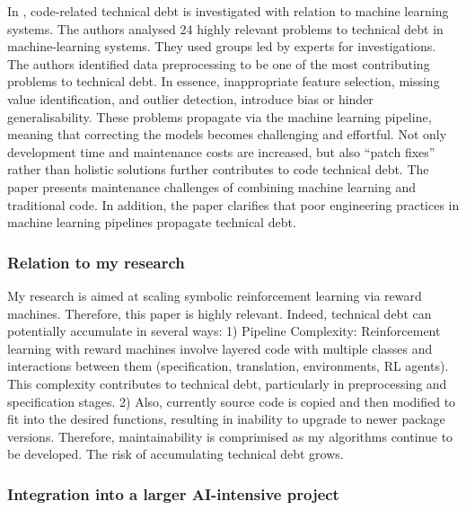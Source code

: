 \documentclass[a4paper,10pt]{article} %
\begin{document}
In \cite{ximenes2025investigating}, code-related technical debt is investigated with relation to machine learning systems.
The authors analysed 24 highly relevant problems to technical debt in machine-learning systems.
They used groups led by experts for investigations.
The authors identified data preprocessing to be one of the most contributing problems to technical debt.
In essence, inappropriate feature selection, missing value identification, and outlier detection,
introduce bias or hinder generalisability.
These problems propagate via the machine learning pipeline, meaning that correcting the models becomes challenging and effortful.
Not only development time and maintenance costs are increased, but also ``patch fixes'' rather than holistic solutions further contributes to code technical debt.
The paper presents maintenance challenges of combining machine learning and traditional code.
In addition, the paper clarifies that poor engineering practices in machine learning pipelines propagate technical debt.

\subsubsection{Relation to my research}

My research is aimed at scaling symbolic reinforcement learning via reward machines.
Therefore, this paper is highly relevant.
Indeed, technical debt can potentially accumulate in several ways: 1) Pipeline Complexity: Reinforcement learning with reward machines involve layered code with multiple classes and interactions between them (specification, translation, environments, RL agents).
This complexity contributes to technical debt, particularly in preprocessing and specification stages.
2) Also, currently source code is copied and then modified to fit into the desired functions, resulting in inability to upgrade to newer package versions.
Therefore, maintainability is comprimised as my algorithms continue to be developed.
The risk of accumulating technical debt grows.


\subsubsection{Integration into a larger AI-intensive project}
\end{document}
